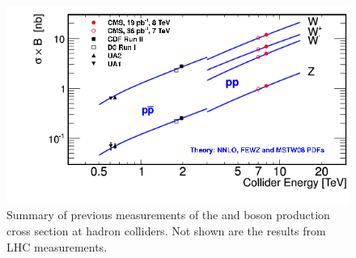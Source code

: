 \begin{figure}
\centering
\includegraphics[width=0.6\linewidth]{plots/Intro/summary.png}
\caption{Summary of previous measurements of the \W and \Z boson production cross section at hadron colliders. Not shown are the results from \sh LHC measurements.}
\label{fig:intro:summary:meas}
\end{figure}
